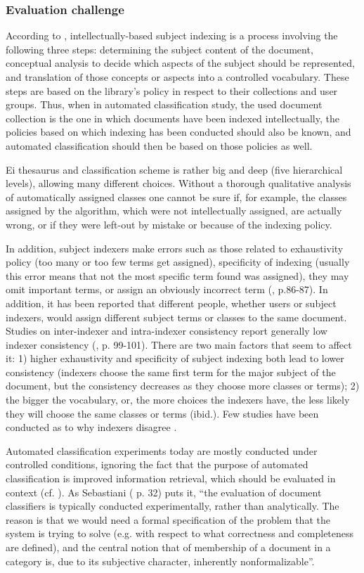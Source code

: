 \subsubsection{Evaluation challenge}
According to \cite{International_85}, intellectually-based subject indexing is a process involving the following three steps: determining the subject content of the document, conceptual analysis to decide which aspects of the subject should be represented, and translation of those concepts or aspects into a controlled vocabulary. These steps are based on the library's policy in respect to their collections and user groups. Thus, when in automated classification study, the used document collection is the one in which documents have been indexed intellectually, the policies based on which indexing has been conducted should also be known, and automated classification should then be based on those policies as well.
 
Ei thesaurus and classification scheme is rather big and deep (five hierarchical levels), allowing many different choices. Without a thorough qualitative analysis of automatically assigned classes one cannot be sure if, for example, the classes assigned by the algorithm, which were not intellectually assigned, are actually wrong, or if they were left-out by mistake or because of the indexing policy.

In addition, subject indexers make errors such as those related to exhaustivity policy (too many or too few terms get assigned), specificity of indexing (usually this error means that not the most specific term found was assigned), they may omit important terms, or assign an obviously incorrect term (\cite{Lancaster_03}, p.86-87). In addition, it has been reported that different people, whether users or subject indexers, would assign different subject terms or classes to the same document. Studies on inter-indexer and intra-indexer consistency report generally low indexer consistency (\cite{Olson_01}, p. 99-101). There are two main factors that seem to affect it: 1) higher exhaustivity and specificity of subject indexing both lead to lower consistency (indexers choose the same first term for the major subject of the document, but the consistency decreases as they choose more classes or terms); 2) the bigger the vocabulary, or, the more choices the indexers have, the less likely they will choose the same classes or terms (ibid.). Few studies have been conducted as to why indexers disagree \cite{Hjorland06}. 

Automated classification experiments today are mostly conducted under controlled conditions, ignoring the fact that the purpose of automated classification is improved information retrieval, which should be evaluated in context (cf. \cite{1Ingwersen_05}). As Sebastiani (\cite{Sebastiani_02} p. 32) puts it, ``the evaluation of document classifiers is typically conducted experimentally, rather than analytically. The reason is that we would need a formal specification of the problem that the system is trying to solve (e.g. with respect to what correctness and completeness are defined), and the central notion that of membership of a document in a category is, due to its subjective character, inherently nonformalizable''.


